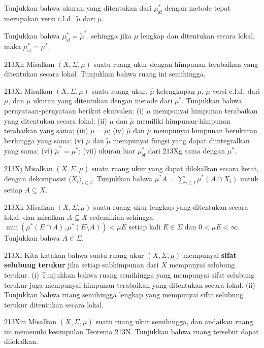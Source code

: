 { Tunjukkan bahwa ukuran yang ditentukan dari
$\mu^*_{\text{sf}}$ dengan metode \Caratheodory tepat merupakan versi
c.l.d.\ $\tilde\mu$ dari $\mu$.

 Tunjukkan bahwa $\mu^*_{\text{sf}}=\tilde\mu^*$, sehingga jika
$\mu$ lengkap dan ditentukan secara lokal, maka
$\mu^*_{\text{sf}}=\mu^*$.

\sqheader 213Xh Misalkan $(X,\Sigma,\mu)$ suatu ruang ukur dengan himpunan
terabaikan yang ditentukan secara lokal.   Tunjukkan bahwa ruang ini semihingga.

\sqheader 213Xi Misalkan $(X,\Sigma,\mu)$ suatu ruang ukur, $\hat\mu$
kelengkapan $\mu$, $\tilde\mu$ versi c.l.d.\ dari $\mu$, dan $\check\mu$
ukuran yang ditentukan dengan metode \Caratheodory dari $\mu^*$.   Tunjukkan
bahwa pernyataan-pernyataan berikut ekuivalen:
(i) $\mu$ mempunyai himpunan terabaikan yang ditentukan secara lokal;
(ii) $\mu$ dan $\tilde\mu$ memiliki
himpunan-himpunan terabaikan yang sama;
(iii) $\check\mu=\tilde\mu$;
(iv) $\hat\mu$ dan $\tilde\mu$ mempunyai himpunan berukuran berhingga yang sama;
(v) $\mu$ dan $\tilde\mu$ mempunyai fungsi yang dapat diintegralkan yang sama;
(vi) $\tilde\mu^*=\mu^*$;
(vii) ukuran luar $\mu^*_{\text{sf}}$ dari 213Xg sama dengan $\mu^*$.

\sqheader 213Xj Misalkan $(X,\Sigma,\mu)$ suatu ruang ukur yang dapat
dilokalkan secara ketat, dengan dekomposisi $\langle X_i\rangle_{i\in I}$.
Tunjukkan bahwa
$\mu^*A=\sum_{i\in I}\mu^*(A\cap X_i)$ untuk setiap $A\subseteq X$.

\sqheader 213Xk Misalkan $(X,\Sigma,\mu)$ suatu ruang ukur lengkap yang
ditentukan secara lokal, dan misalkan $A\subseteq X$ sedemikian sehingga
$\min(\mu^*(E\cap A),\mu^*(E\setminus A))<\mu E$ setiap kali $E\in\Sigma$
dan $0<\mu E<\infty$.
Tunjukkan bahwa $A\in\Sigma$.   

\spheader 213Xl Kita katakan bahwa suatu ruang ukur $(X,\Sigma,\mu)$
mempunyai {\bf sifat selubung terukur} jika setiap subhimpunan dari $X$ mempunyai
selubung terukur.   (i) Tunjukkan bahwa ruang semihingga yang mempunyai sifat
selubung terukur juga mempunyai himpunan terabaikan yang ditentukan secara lokal.
(ii) Tunjukkan bahwa ruang semihingga lengkap yang mempunyai sifat selubung
terukur ditentukan secara lokal.

\spheader 213Xm Misalkan $(X,\Sigma,\mu)$ suatu ruang ukur semihingga, dan
andaikan ruang ini memenuhi kesimpulan Teorema 213N.   Tunjukkan bahwa ruang
tersebut dapat dilokalkan.   

}

